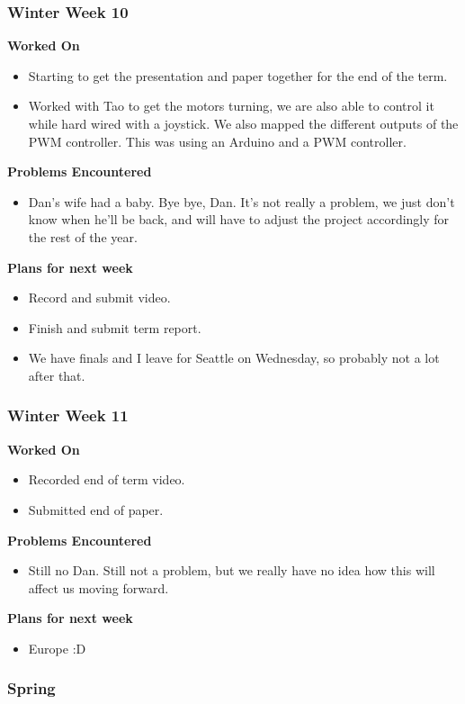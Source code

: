 \documentclass[compsoc,draftclsnofoot,onecolumn,10pt]{IEEEtran}
\begin{document}
\subsubsection*{Winter Week 10}
\textbf{Worked On}
\begin{itemize}
    \item Starting to get the presentation and paper together for the end of the term.
    \item Worked with Tao to get the motors turning, we are also able to control it while hard wired with a joystick. We also mapped the different outputs of the PWM controller. This was using an Arduino and a PWM controller.
\end{itemize}
\textbf{Problems Encountered}
\begin{itemize}
    \item Dan's wife had a baby. Bye bye, Dan. It's not really a problem, we just don't know when he'll be back, and will have to adjust the project accordingly for the rest of the year.
\end{itemize}
\textbf{Plans for next week}
\begin{itemize}
    \item Record and submit video.
    \item Finish and submit term report.
    \item We have finals and I leave for Seattle on Wednesday, so probably not a lot after that.
\end{itemize}


\subsubsection*{Winter Week 11}
\textbf{Worked On}
\begin{itemize}
    \item Recorded end of term video.
    \item Submitted end of paper.
\end{itemize}
\textbf{Problems Encountered}
\begin{itemize}
    \item Still no Dan. Still not a problem, but we really have no idea how this will affect us moving forward.
\end{itemize}
\textbf{Plans for next week}
\begin{itemize}
    \item Europe :D
\end{itemize}


\subsubsection{Spring}
\end{document}
